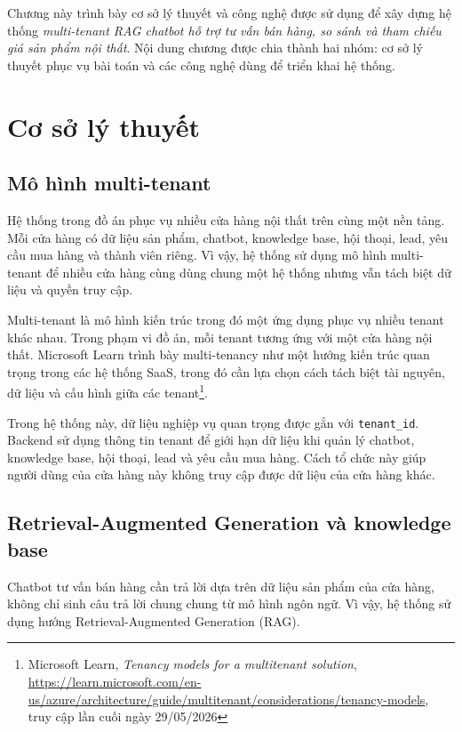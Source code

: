 \documentclass[../DoAn.tex]{subfiles}
\begin{document}
Chương này trình bày cơ sở lý thuyết và công nghệ được sử dụng để xây dựng hệ thống \textit{multi-tenant RAG chatbot hỗ trợ tư vấn bán hàng, so sánh và tham chiếu giá sản phẩm nội thất}. Nội dung chương được chia thành hai nhóm: cơ sở lý thuyết phục vụ bài toán và các công nghệ dùng để triển khai hệ thống.

\section{Cơ sở lý thuyết}
\label{section:3.1}

\subsection{Mô hình multi-tenant}
\label{subsection:3.1.1}

Hệ thống trong đồ án phục vụ nhiều cửa hàng nội thất trên cùng một nền tảng. Mỗi cửa hàng có dữ liệu sản phẩm, chatbot, knowledge base, hội thoại, lead, yêu cầu mua hàng và thành viên riêng. Vì vậy, hệ thống sử dụng mô hình multi-tenant để nhiều cửa hàng cùng dùng chung một hệ thống nhưng vẫn tách biệt dữ liệu và quyền truy cập.

Multi-tenant là mô hình kiến trúc trong đó một ứng dụng phục vụ nhiều tenant khác nhau. Trong phạm vi đồ án, mỗi tenant tương ứng với một cửa hàng nội thất. Microsoft Learn trình bày multi-tenancy như một hướng kiến trúc quan trọng trong các hệ thống SaaS, trong đó cần lựa chọn cách tách biệt tài nguyên, dữ liệu và cấu hình giữa các tenant\footnote{Microsoft Learn, \textit{Tenancy models for a multitenant solution}, \url{https://learn.microsoft.com/en-us/azure/architecture/guide/multitenant/considerations/tenancy-models}, truy cập lần cuối ngày 29/05/2026}.

Trong hệ thống này, dữ liệu nghiệp vụ quan trọng được gắn với \texttt{tenant\_id}. Backend sử dụng thông tin tenant để giới hạn dữ liệu khi quản lý chatbot, knowledge base, hội thoại, lead và yêu cầu mua hàng. Cách tổ chức này giúp người dùng của cửa hàng này không truy cập được dữ liệu của cửa hàng khác.

\subsection{Retrieval-Augmented Generation và knowledge base}
\label{subsection:3.1.2}

Chatbot tư vấn bán hàng cần trả lời dựa trên dữ liệu sản phẩm của cửa hàng, không chỉ sinh câu trả lời chung chung từ mô hình ngôn ngữ. Vì vậy, hệ thống sử dụng hướng Retrieval-Augmented Generation (RAG).
\end{document}
